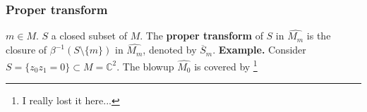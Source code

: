 \documentclass{beamer}
\begin{document}
\begin{frame}
\frametitle{Proper transform}

$m \in M$. $S$ a closed subset of $M$. The \textbf{proper transform} of $S$ in $\widehat{M_m}$ is the closure of $\beta^{-1}(S\setminus \{m\})$ in $\widehat{M_m}$, denoted by $\overline{S}_m$. \newline \textbf{Example.} Consider $S = \{z_0z_1 = 0\} \subset M = \mathbb{C}^2$. The blowup $\widehat{M_0}$ is covered by \footnote{I really lost it here...}


\end{frame}
\end{document}

